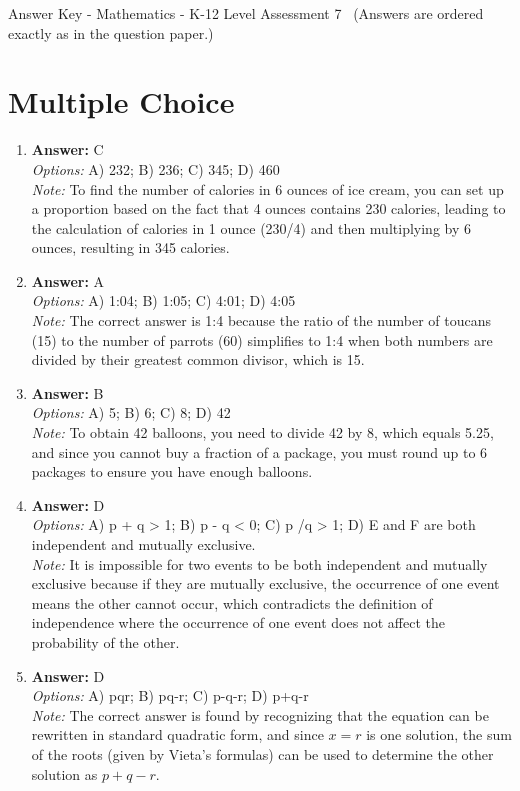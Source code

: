 \documentclass[12pt]{article}
\begin{document}
\begin{center}
Answer Key - Mathematics - K-12 Level Assessment 7 \
\small (Answers are ordered exactly as in the question paper.)
\end{center}

\section*{Multiple Choice}
\begin{enumerate}[label=\arabic*.]
\item \textbf{Answer:} C
\\ \textit{Options:} A) 232; B) 236; C) 345; D) 460
\\ \textit{Note:} To find the number of calories in 6 ounces of ice cream, you can set up a proportion based on the fact that 4 ounces contains 230 calories, leading to the calculation of calories in 1 ounce (230/4) and then multiplying by 6 ounces, resulting in 345 calories.
\item \textbf{Answer:} A
\\ \textit{Options:} A) 1:04; B) 1:05; C) 4:01; D) 4:05
\\ \textit{Note:} The correct answer is 1:4 because the ratio of the number of toucans (15) to the number of parrots (60) simplifies to 1:4 when both numbers are divided by their greatest common divisor, which is 15.
\item \textbf{Answer:} B
\\ \textit{Options:} A) 5; B) 6; C) 8; D) 42
\\ \textit{Note:} To obtain 42 balloons, you need to divide 42 by 8, which equals 5.25, and since you cannot buy a fraction of a package, you must round up to 6 packages to ensure you have enough balloons.
\item \textbf{Answer:} D
\\ \textit{Options:} A) p + q \textgreater{} 1; B) p - q \textless{} 0; C) p /q \textgreater{} 1; D) E and F are both independent and mutually exclusive.
\\ \textit{Note:} It is impossible for two events to be both independent and mutually exclusive because if they are mutually exclusive, the occurrence of one event means the other cannot occur, which contradicts the definition of independence where the occurrence of one event does not affect the probability of the other.
\item \textbf{Answer:} D
\\ \textit{Options:} A) pqr; B) pq-r; C) p-q-r; D) p+q-r
\\ \textit{Note:} The correct answer is found by recognizing that the equation can be rewritten in standard quadratic form, and since $x = r$ is one solution, the sum of the roots (given by Vieta's formulas) can be used to determine the other solution as $p + q - r$.
\end{enumerate}
\end{document}
